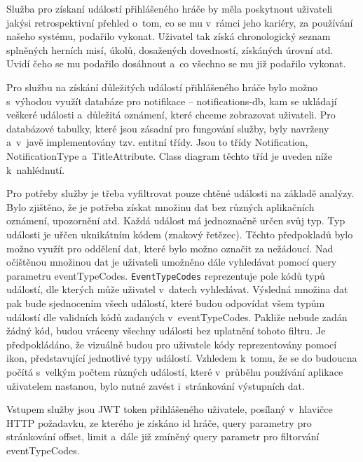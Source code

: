 \documentclass[12pt]{article}
\begin{document}
{Služba pro získaní událostí přihlášeného hráče by měla poskytnout
uživateli jakýsi retrospektivní přehled o~tom,
co se mu v~rámci jeho kariéry, za používání našeho systému, podařilo vykonat.
Uživatel tak získá chronologický seznam splněných herních misí, úkolů,
dosažených dovedností, získáných úrovní atd.
Uvidí čeho se mu podařilo dosáhnout a~co všechno se mu již podařilo vykonat.


Pro službu na získání důležitých událostí přihlášeného hráče
bylo možno s~výhodou využít databáze pro notifikace -- notifications-db,
kam se ukládají veškeré události a~důležitá oznámení, které chceme zobrazovat uživateli.
Pro databázové tabulky, které jsou zásadní pro fungování služby, byly navrženy a~v~javě implementovány tzv. entitní třídy.
Jsou to třídy Notification, NotificationType a~TitleAttribute. 
Class diagram těchto tříd je uveden níže k~nahlédnutí.


\clearpage


\obrazek
{}

Pro potřeby služby je třeba vyfiltrovat pouze chtěné události na základě analýzy.
Bylo zjištěno, že je potřeba získat množinu dat bez různých aplikačních oznámení, upozornění atd.
Každá událost má jednoznačně určen svůj typ.
Typ události je uřčen uknikátním kódem (znakový řetězec).
Těchto předpokladů bylo možno využít pro oddělení dat, které bylo možno označit za nežádoucí.
Nad očištěnou množinou dat je uživateli umožněno dále vyhledávat pomocí query parametru eventTypeCodes.
\texttt{EventTypeCodes} reprezentuje pole kódů typů událostí, dle kterých může uživatel v~datech vyhledávat.
Výsledná množina dat pak bude sjednocením všech událostí,
které budou odpovídat všem typům událostí dle validních kódů zadaných v~eventTypeCodes.
Pakliže nebude zadán žádný kód, budou vráceny všechny události bez uplatnění tohoto filtru.
Je předpokládáno, že vizuálně budou pro uživatele kódy reprezentovány pomocí ikon,
představující jednotlivé typy událostí.
Vzhledem k~tomu, že se do budoucna počítá s~velkým počtem různých událostí, 
které v~průběhu používání aplikace uživatelem nastanou, 
bylo nutné zavést i~stránkování výstupních dat. 

Vstupem služby jsou JWT token přihlášeného uživatele, posílaný v~hlavičce HTTP požadavku,
ze kterého je získáno id hráče, query parametry pro stránkování offset, limit
a~dále již zmíněný query parametr pro filtorvání eventTypeCodes. 

}
\end{document}
